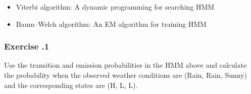 \begin{itemize}
\item Viterbi algorithm: A dynamic programming for searching HMM
\item Baum–Welch algorithm: An EM algorithm for training HMM
\end{itemize}

%
%
\subsubsection*{Exercise \thesection.1}
Use the transition and emission probabilities in the HMM above and calculate the probability when the observed weather conditions are (Rain, Rain, Sunny) and the corresponding states are (H, L, L). 

\bigskip 

\bigskip 

%
